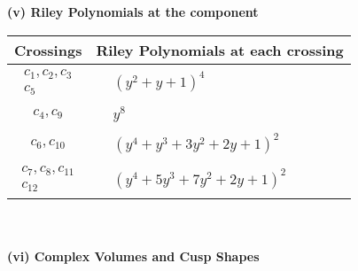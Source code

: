 \documentclass[1p]{elsarticle_modified}
\theoremstyle{definition}
\begin{document}
\newpage\renewcommand{\arraystretch}{1}
\flushleft \textbf{(v) Riley Polynomials at the component}\newline \\
\begin{tabular}{m{50pt}|m{274pt}}
Crossings & \hspace{64pt}Riley Polynomials at each crossing \\
\hline $$\begin{aligned}c_{1},c_{2},c_{3}\\c_{5}\end{aligned}$$&$\begin{aligned}
&(y^2+y+1)^4
\end{aligned}$\\
\hline $$\begin{aligned}c_{4},c_{9}\end{aligned}$$&$\begin{aligned}
&y^8
\end{aligned}$\\
\hline $$\begin{aligned}c_{6},c_{10}\end{aligned}$$&$\begin{aligned}
&(y^4+y^3+3 y^2+2 y+1)^2
\end{aligned}$\\
\hline $$\begin{aligned}c_{7},c_{8},c_{11}\\c_{12}\end{aligned}$$&$\begin{aligned}
&(y^4+5 y^3+7 y^2+2 y+1)^2
\end{aligned}$\\
\hline
\end{tabular}\\~\\
\newpage\flushleft \textbf{(vi) Complex Volumes and Cusp Shapes}
\end{document}
